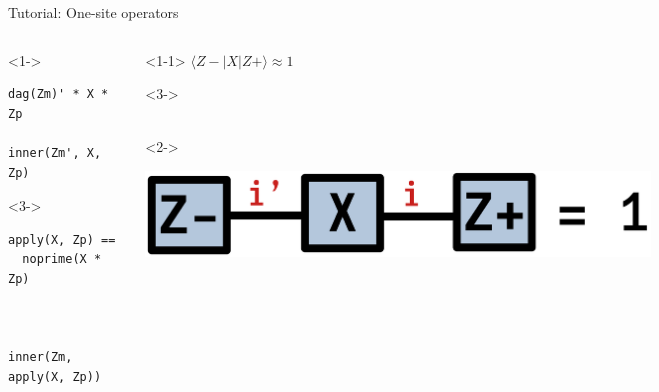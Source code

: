 \begin{frame}[fragile]{Tutorial: One-site operators}

\begin{columns}

\begin{column}{4.5cm}

\begin{onlyenv}<1->
\begin{lstlisting}[language=JuliaLocal, style=julia, basicstyle=\small]
dag(Zm)' * X * Zp

inner(Zm', X, Zp)
\end{lstlisting}
\end{onlyenv}

\begin{onlyenv}<3->
~\\
\begin{lstlisting}[language=JuliaLocal, style=julia, basicstyle=\small]
apply(X, Zp) == 
  noprime(X * Zp)



inner(Zm, apply(X, Zp))
\end{lstlisting}
\end{onlyenv}

\end{column}

\begin{column}{4.5cm}

\begin{onlyenv}<1-1>
$\langle Z-|X|Z+\rangle \approx 1$ \\
\end{onlyenv}

\begin{onlyenv}<3->
~\\
~\\
\end{onlyenv}

\begin{onlyenv}<2->
\vspace*{-0.2cm}
\begin{center}
\includegraphics[width=0.7\textwidth]{
  slides/assets/ZmXZp.png
}
\end{center}
\vspace*{0.0cm}
\end{onlyenv}


\end{column}
\end{columns}
\end{frame}
